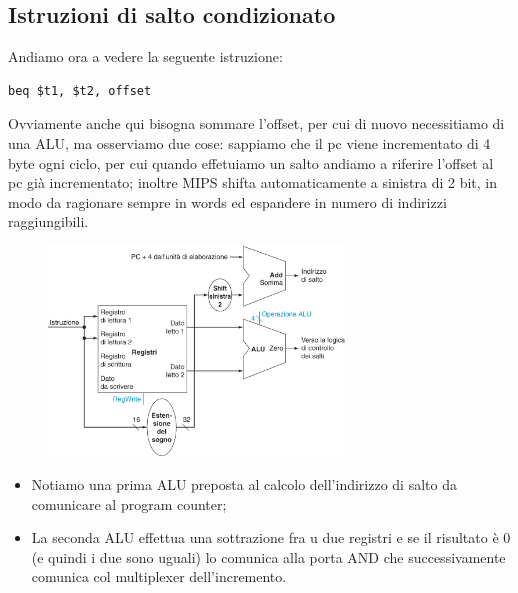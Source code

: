 \documentclass[class=book, crop=false, oneside]{standalone}
\begin{document}
\subsection{Istruzioni di salto condizionato}
Andiamo ora a vedere la seguente istruzione:
\begin{verbatim}
beq $t1, $t2, offset
\end{verbatim}
Ovviamente anche qui bisogna sommare l'offset, per cui di nuovo necessitiamo di una ALU, ma osserviamo due cose: sappiamo che il pc viene incrementato di 4 byte ogni ciclo, per cui quando effetuiamo un salto andiamo a riferire l'offset al pc già incrementato; inoltre MIPS shifta automaticamente a sinistra di 2 bit, in modo da ragionare sempre in words ed espandere in numero di indirizzi raggiungibili.
\begin{figure}[H]
	\centering
	\includegraphics[width=0.7\textwidth,keepaspectratio]{jump.png}
\end{figure}
\begin{itemize}
	\item Notiamo una prima ALU preposta al calcolo dell'indirizzo di salto da comunicare al program counter;
	\item La seconda ALU effettua una sottrazione fra u due registri e se il risultato è 0 (e quindi i due sono uguali) lo comunica alla porta AND che successivamente comunica col multiplexer dell'incremento.
\end{itemize}
\end{document}
